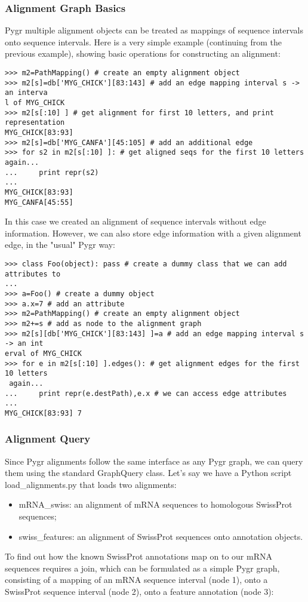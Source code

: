 \documentclass{howto}
\begin{document}
\subsubsection{Alignment Graph Basics}

Pygr multiple alignment objects can be treated as mappings of sequence intervals onto sequence intervals.  Here is a very simple example (continuing from the previous example), showing basic operations for constructing an alignment:

\begin{verbatim}
>>> m2=PathMapping() # create an empty alignment object
>>> m2[s]=db['MYG_CHICK'][83:143] # add an edge mapping interval s -> an interva
l of MYG_CHICK
>>> m2[s[:10] ] # get alignment for first 10 letters, and print representation
MYG_CHICK[83:93]
>>> m2[s]=db['MYG_CANFA'][45:105] # add an additional edge
>>> for s2 in m2[s[:10] ]: # get aligned seqs for the first 10 letters again...
...     print repr(s2)
...
MYG_CHICK[83:93]
MYG_CANFA[45:55]
\end{verbatim}
In this case we created an alignment of sequence intervals without edge information.  However, we can also store edge information with a given alignment edge, in the "usual" Pygr way:

\begin{verbatim}
>>> class Foo(object): pass # create a dummy class that we can add attributes to
...
>>> a=Foo() # create a dummy object
>>> a.x=7 # add an attribute
>>> m2=PathMapping() # create an empty alignment object
>>> m2+=s # add as node to the alignment graph
>>> m2[s][db['MYG_CHICK'][83:143] ]=a # add an edge mapping interval s -> an int
erval of MYG_CHICK
>>> for e in m2[s[:10] ].edges(): # get alignment edges for the first 10 letters
 again...
...     print repr(e.destPath),e.x # we can access edge attributes
...
MYG_CHICK[83:93] 7
\end{verbatim}

\subsubsection{Alignment Query}

Since Pygr alignments follow the same interface as any Pygr graph, we can query them using the standard GraphQuery class.  Let's say we have a Python script load_alignments.py that loads two alignments:

\begin{itemize}

\item
mRNA_swiss: an alignment of mRNA sequences to homologous SwissProt sequences;

\item
swiss_features: an alignment of SwissProt sequences onto annotation objects. 

\end{itemize}
To find out how the known SwissProt annotations map on to our mRNA sequences requires a join, which can be formulated as a simple Pygr graph, consisting of a mapping of an mRNA sequence interval (node 1), onto a SwissProt sequence interval (node 2), onto a feature annotation (node 3):
\end{document}
